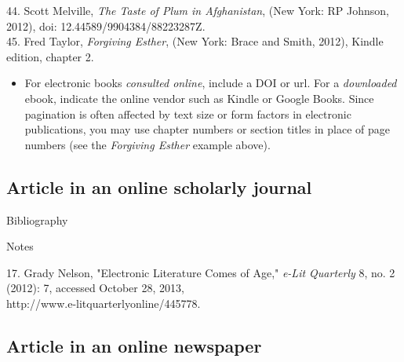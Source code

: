 \begin{singlespace}
\noindent\hspace{1.2cm}44. Scott Melville, \emph{The Taste of Plum in
Afghanistan}, (New York: RP Johnson, 2012), doi: 12.44589/9904384/88223287Z.\\

\noindent\hspace{1.2cm}45. Fred Taylor, \emph{Forgiving Esther}, (New York:
Brace and Smith, 2012), Kindle edition, chapter 2.
\end{singlespace}

\begin{itemize}\item For electronic books \emph{consulted online}, include a DOI
or url. For a \emph{downloaded} ebook, indicate the online vendor such as Kindle
or Google Books. Since pagination is often affected by text size or form factors
in electronic publications, you may use chapter numbers or section titles in
place of page numbers (see the \emph{Forgiving Esther} example
above).\end{itemize}

\subsection{Article in an online scholarly journal}

\begin{center}{Bibliography}\end{center}

\begin{singlespace}
\noindent{}
\end{singlespace}

\begin{center}{Notes}\end{center} 
\begin{singlespace}
\noindent\hspace{1.2cm}17. Grady Nelson,
"Electronic Literature Comes of Age," \emph{e-Lit Quarterly} 8, no. 2 (2012): 7,
accessed October 28, 2013, \\http://www.e-litquarterlyonline/445778.
\end{singlespace}

\subsection{Article in an online newspaper}

